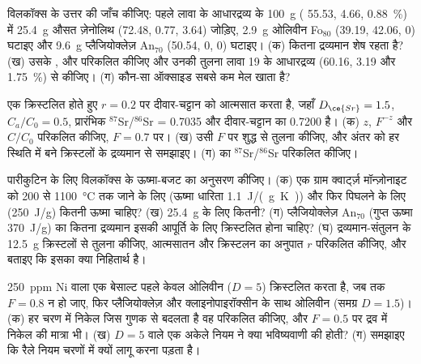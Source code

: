 \begin{exercise}[$\star\star$]\label{exo:b2:magmatic-differentiation:9}
विलकॉक्स के उत्तर की जाँच कीजिए: पहले लावा के आधारद्रव्य के \qty{100}{g} (
55.53,  4.66,  \qty{0.88}{\percent}) में \qty{25.4}{g} औसत
ज़ेनोलिथ (72.48, 0.77, 3.64) जोड़िए, \qty{2.9}{g} ओलिवीन Fo$_{80}$ (39.19, 42.06, 0) घटाइए
और \qty{9.6}{g} प्लैजियोक्लेज़ An$_{70}$ (50.54, 0, 0) घटाइए। (क) कितना द्रव्यमान शेष रहता है?
(ख) उसके ,  और  परिकलित कीजिए और उनकी तुलना लावा 19 के
आधारद्रव्य (60.16, 3.19 और \qty{1.75}{\percent}) से कीजिए। (ग) कौन-सा ऑक्साइड सबसे कम मेल खाता है?
\end{exercise}

\begin{exercise}[$\star\star\star$]\label{exo:b2:magmatic-differentiation:10}
एक  क्रिस्टलित होते हुए $r = 0.2$ पर दीवार-चट्टान को आत्मसात करता है, जहाँ $D_{\ce{Sr}} =
1.5$, $C_a/C_0 = 0.5$, प्रारंभिक $^{87}$Sr/$^{86}$Sr = 0.7035 और दीवार-चट्टान का 0.7200 है।
(क) $z$, $F^{-z}$ और $C/C_0$ परिकलित कीजिए, $F = 0.7$ पर। (ख) उसी $F$ पर शुद्ध  से तुलना कीजिए, और अंतर को हर स्थिति में बने क्रिस्टलों के द्रव्यमान से समझाइए।
(ग)  का $^{87}$Sr/$^{86}$Sr परिकलित कीजिए।
\end{exercise}

\begin{exercise}[$\star\star\star$]\label{exo:b2:magmatic-differentiation:11}
पारीकुटिन के लिए विलकॉक्स के ऊष्मा-बजट का अनुसरण कीजिए। (क) एक ग्राम क्वार्ट्ज़
मॉन्ज़ोनाइट को 200 से \qty{1100}{\celsius} तक जाने के लिए (ऊष्मा धारिता
\qty{1.1}{J/(g.K)}) और फिर पिघलने के लिए (\qty{250}{J/g}) कितनी ऊष्मा चाहिए? (ख)
\qty{25.4}{g} के लिए कितनी? (ग) प्लैजियोक्लेज़ An$_{70}$ (गुप्त ऊष्मा \qty{370}{J/g}) का कितना
द्रव्यमान इसकी आपूर्ति के लिए क्रिस्टलित होना चाहिए? (घ) द्रव्यमान-संतुलन के \qty{12.5}{g} क्रिस्टलों से
तुलना कीजिए, आत्मसातन और क्रिस्टलन का अनुपात $r$ परिकलित कीजिए, और बताइए कि
इसका क्या निहितार्थ है।
\end{exercise}

\begin{exercise}[$\star\star\star$]\label{exo:b2:magmatic-differentiation:12}
\qty{250}{ppm} Ni वाला एक बेसाल्ट पहले केवल ओलिवीन ($D = 5$) क्रिस्टलित करता है, जब तक
$F = 0.8$ न हो जाए, फिर प्लैजियोक्लेज़ और क्लाइनोपाइरॉक्सीन के साथ ओलिवीन (समग्र $D = 1.5$)। (क)
हर चरण में निकेल जिस गुणक से बदलता है वह परिकलित कीजिए, और $F = 0.5$ पर
द्रव में निकेल की मात्रा भी। (ख) $D = 5$ वाले एक अकेले नियम ने क्या भविष्यवाणी की होती?
(ग) समझाइए कि रैले नियम चरणों में क्यों लागू करना पड़ता है।
\end{exercise}

